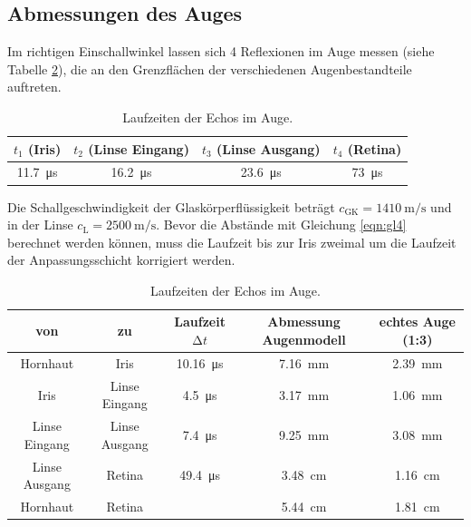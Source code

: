 \FloatBarrier

\subsection{Abmessungen des Auges}

Im richtigen Einschallwinkel lassen sich 4 Reflexionen im Auge messen (siehe Tabelle \ref{tab:Auge}), die an den Grenzflächen der verschiedenen Augenbestandteile auftreten.
\begin{table}
  \centering
  \caption{Laufzeiten der Echos im Auge.}
  \label{tab:Auge}
  \begin{tabular}{c c c c}
    \toprule
    $t_1$ (Iris) & $t_2$ (Linse Eingang) & $t_3$ (Linse Ausgang) & $t_4$ (Retina) \\
    \midrule
    \SI{11.7}{\micro\second} & \SI{16.2}{\micro\second} & \SI{23.6}{\micro\second} & \SI{73}{\micro\second} \\
    \bottomrule
  \end{tabular}
\end{table}
Die Schallgeschwindigkeit der Glaskörperflüssigkeit beträgt $c_\text{GK} = \SI{1410}{\meter\per\second}$ und in der Linse $c_\text{L} = \SI{2500}{\meter\per\second}$.
Bevor die Abstände mit Gleichung \eqref{eqn:gl4} berechnet werden können, muss die Laufzeit bis zur Iris zweimal um die Laufzeit der Anpassungsschicht korrigiert werden.
\begin{table}
  \centering
  \caption{Laufzeiten der Echos im Auge.}
  \label{tab:Auge}
  \begin{tabular}{c c c c c}
    \toprule
    von & zu & Laufzeit $\increment t$ & Abmessung Augenmodell & echtes Auge (1:3) \\
    \midrule
    Hornhaut & Iris & \SI{10.16}{\micro\second} & \SI{7.16}{\milli\meter} & \SI{2.39}{\milli\meter}  \\
    Iris & Linse Eingang & \SI{4.5}{\micro\second} & \SI{3.17}{\milli\meter} & \SI{1.06}{\milli\meter} \\
    Linse Eingang & Linse Ausgang & \SI{7.4}{\micro\second} & \SI{9.25}{\milli\meter} & \SI{3.08}{\milli\meter} \\
    Linse Ausgang & Retina & \SI{49.4}{\micro\second} & \SI{3.48}{\centi\meter} & \SI{1.16}{\centi\meter} \\
    Hornhaut & Retina & & \SI{5.44}{\centi\meter} & \SI{1.81}{\centi\meter} \\
    \bottomrule
  \end{tabular}
\end{table}
